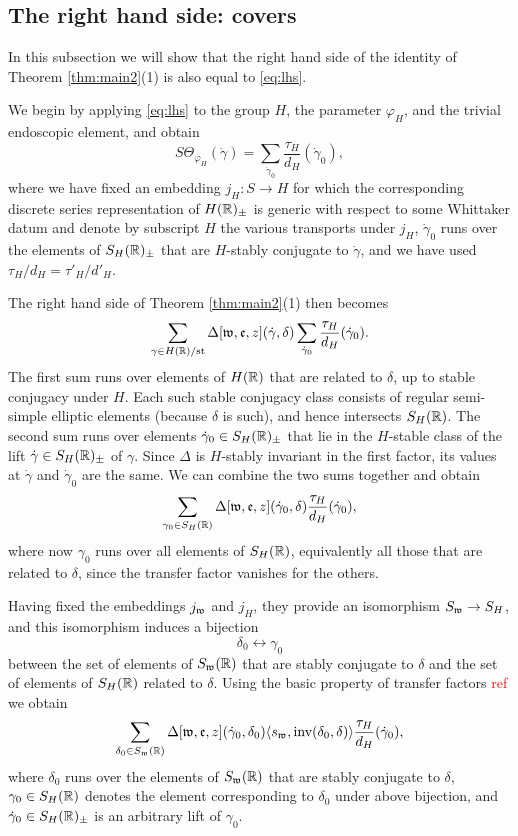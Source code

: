 \documentclass{article}
\theoremstyle{definition}
\numberwithin{equation}{section}
\renewcommand{\-}{\hyp{}}
\begin{document}
\subsection{The right hand side: covers} \label{sub:rhs_cover}

In this subsection we will show that the right hand side of the identity of Theorem \ref{thm:main2}(1) is also equal to \eqref{eq:lhs}.

We begin by applying \eqref{eq:lhs} to the group $H$, the parameter $\varphi_H$, and the trivial endoscopic element, and obtain
\[ S\Theta_{\varphi_H}(\dot\gamma) = \sum_{\dot\gamma_0} \frac{\tau_H}{d_{H}}(\dot\gamma_0), \]
where we have fixed an embedding $j_H : S \to H$ for which the corresponding discrete series representation of $H(\mathbb{R})_\pm$ is generic with respect to some Whittaker datum and denote by subscript $H$ the various transports under $j_H$, $\dot\gamma_0$ runs over the elements of $S_H(\mathbb{R})_\pm$ that are $H$-stably conjugate to $\dot\gamma$, and we have used $\tau_H/d_H=\tau'_H/d'_H$.

The right hand side of Theorem \ref{thm:main2}(1) then becomes
\[ \sum_{\gamma \in H(\mathbb{R})/\textrm{st}} \Delta[\mathfrak{w},\mathfrak{e},z](\dot\gamma,\delta)\sum_{\dot\gamma_0} \frac{\tau_H}{d_{H}}(\dot\gamma_0). \]
The first sum runs over elements of $H(\mathbb{R})$ that are related to $\delta$, up to stable conjugacy under $H$. Each such stable conjugacy class consists of regular semi-simple elliptic elements (because $\delta$ is such), and hence intersects $S_H(\mathbb{R})$. The second sum runs over elements $\dot\gamma_0 \in S_H(\mathbb{R})_\pm$ that lie in the $H$-stable class of the lift $\dot\gamma \in S_H(\mathbb{R})_\pm$ of $\gamma$. Since $\Delta$ is $H$-stably invariant in the first factor, its values at $\dot\gamma$ and $\dot\gamma_0$ are the same. We can combine the two sums together and obtain
\[ \sum_{\gamma_0 \in S_H(\mathbb{R})} \Delta[\mathfrak{w},\mathfrak{e},z](\dot\gamma_0,\delta) \frac{\tau_H}{d_{H}}(\dot\gamma_0), \]
where now $\gamma_0$ runs over all elements of $S_H(\mathbb{R})$, equivalently all those that are related to $\delta$, since the transfer factor vanishes for the others.


Having fixed the embeddings $j_{\mathfrak{w}}$ and $j_H$, they provide an isomorphism $S_{\mathfrak{w}} \to S_H$, and this isomorphism induces a bijection
\[ \delta_0 \leftrightarrow \gamma_0 \]
between the set of elements of $S_{\mathfrak{w}}(\mathbb{R})$ that are stably conjugate to $\delta$ and the set of elements of $S_H(\mathbb{R})$ related to $\delta$. Using the basic property of transfer factors \textcolor{red}{ref} we obtain
\begin{equation} \label{eq:rhs1}
\sum_{\delta_0 \in S_{\mathfrak{w}}(\mathbb{R})} \Delta[\mathfrak{w},\mathfrak{e},z](\dot\gamma_0,\delta_0)\langle s_{\mathfrak{w}},\textrm{inv}(\delta_0,\delta)\rangle \frac{\tau_H}{d_{H}}(\dot\gamma_0),
\end{equation}
where $\delta_0$ runs over the elements of $S_{\mathfrak{w}}(\mathbb{R})$ that are stably conjugate to $\delta$, $\gamma_0 \in S_H(\mathbb{R})$ denotes the element corresponding to $\delta_0$ under above bijection, and $\dot\gamma_0 \in S_H(\mathbb{R})_\pm$ is an arbitrary lift of $\gamma_0$.
\end{document}
